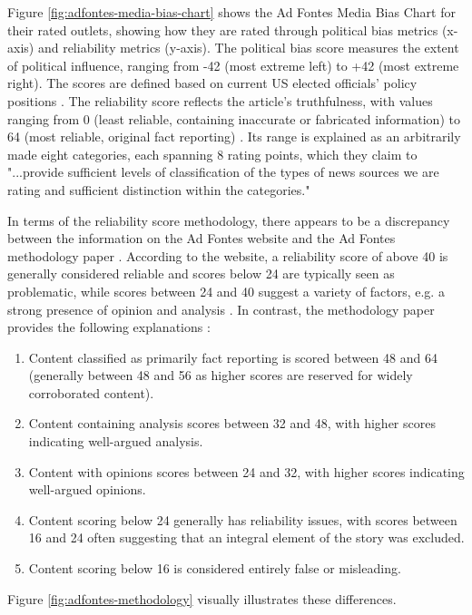 Figure \ref{fig:adfontes-media-bias-chart} shows the Ad Fontes Media Bias Chart for their rated outlets, showing how they are rated through political bias metrics (x-axis) and reliability metrics (y-axis). The political bias score measures the extent of political influence, ranging from -42 (most extreme left) to +42 (most extreme right). The scores are defined based on current US elected officials' policy positions \cite{otero-2021-adfontes-methodology}. The reliability score reflects the article's truthfulness, with values ranging from 0 (least reliable, containing inaccurate or fabricated information) to 64 (most reliable, original fact reporting) \cite{adfontes-bias-reliability}. Its range is explained as an arbitrarily made eight categories, each spanning 8 rating points, which they claim to "...provide sufficient levels of classification of the types of news sources we are rating and sufficient distinction within the categories." \cite{otero-2021-adfontes-methodology}

In terms of the reliability score methodology,  there appears to be a discrepancy between the information on the Ad Fontes website \cite{adfontes-bias-reliability} and the Ad Fontes methodology paper \cite{otero-2021-adfontes-methodology}. According to the website, a reliability score of above 40 is generally considered reliable and scores below 24 are typically seen as problematic, while scores between 24 and 40 suggest a variety of factors, e.g. a strong presence of opinion and analysis \cite{adfontes-bias-reliability}. In contrast, the methodology paper provides the following explanations \cite{otero-2021-adfontes-methodology}:
\begin{enumerate}
    \item Content classified as primarily fact reporting is scored between 48 and 64 (generally between 48 and 56 as higher scores are reserved for widely corroborated content).
    \item Content containing analysis scores between 32 and 48, with higher scores indicating well-argued analysis.
    \item Content with opinions scores between 24 and 32, with higher scores indicating well-argued opinions.
    \item Content scoring below 24 generally has reliability issues, with scores between 16 and 24 often suggesting that an integral element of the story was excluded.
    \item Content scoring below 16 is considered entirely false or misleading.
\end{enumerate}
Figure \ref{fig:adfontes-methodology} visually illustrates these differences.


